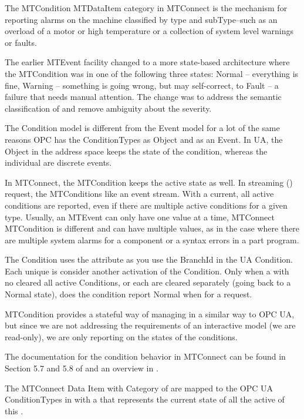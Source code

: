 The \gls{MTCondition} \gls{MTDataItem} \gls{category} in MTConnect is the mechanism for reporting alarms on the machine classified by type and subType--such as an overload of a motor or high temperature or a collection of system level warnings or faults.

The earlier  \gls{MTEvent} facility changed to a more state-based architecture where the \gls{MTCondition} was in one of the following three states: Normal – everything is fine, Warning – something is going wrong, but may self-correct, to Fault – a failure that needs manual attention. The change was to address the semantic classification of  and remove ambiguity about the  severity.

The Condition model is different from the Event model for a lot of the same reasons OPC has the \glspl{ConditionType} as \gls{Object} and as an \gls{Event}. In UA, the \gls{Object} in the address space keeps the state of the condition, whereas the individual  are discrete events.

In MTConnect, the \gls{MTCondition} keeps the active state as well. In streaming () request, the \glspl{MTCondition} like an event stream. With a \gls{current}, all active conditions are reported, even if there are multiple active conditions for a given type. Usually, an \gls{MTEvent} can only have one value at a time, MTConnect \gls{MTCondition} is different and can have multiple values, as in the case where there are multiple system alarms for a component or a syntax errors in a part program.

The Condition uses the attribute  as you use the BranchId in the UA Condition. Each unique  is consider another activation of the Condition. Only when a  with no  cleared all active Conditions, or each are cleared separately (going back to a Normal state), does the condition report Normal when for a  request.

\gls{MTCondition} provides a stateful way of managing  in a similar way to OPC UA, but since we are not addressing the requirements of an interactive model (we are read-only), we are only reporting on the states of the conditions. 

The documentation for the condition behavior in MTConnect can be found in Section 5.7 and 5.8 of \cite{MTCPart3} and an overview in \cite{MTCPart2}.

The MTConnect Data Item with Category of  are mapped to the OPC UA \glspl{ConditionType}  in \cite{UAPart9} with a  that represents the current state of all the active  of this .

